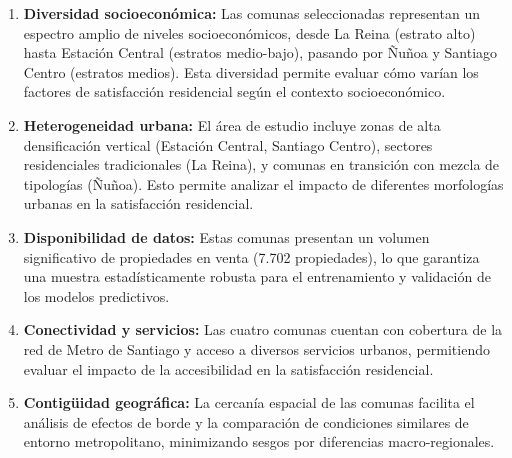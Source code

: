 \begin{enumerate}
    \item \textbf{Diversidad socioeconómica:} Las comunas seleccionadas representan un espectro amplio de niveles socioeconómicos, desde La Reina (estrato alto) hasta Estación Central (estratos medio-bajo), pasando por Ñuñoa y Santiago Centro (estratos medios). Esta diversidad permite evaluar cómo varían los factores de satisfacción residencial según el contexto socioeconómico.
    
    \item \textbf{Heterogeneidad urbana:} El área de estudio incluye zonas de alta densificación vertical (Estación Central, Santiago Centro), sectores residenciales tradicionales (La Reina), y comunas en transición con mezcla de tipologías (Ñuñoa). Esto permite analizar el impacto de diferentes morfologías urbanas en la satisfacción residencial.
    
    \item \textbf{Disponibilidad de datos:} Estas comunas presentan un volumen significativo de propiedades en venta (7.702 propiedades), lo que garantiza una muestra estadísticamente robusta para el entrenamiento y validación de los modelos predictivos.
    
    \item \textbf{Conectividad y servicios:} Las cuatro comunas cuentan con cobertura de la red de Metro de Santiago y acceso a diversos servicios urbanos, permitiendo evaluar el impacto de la accesibilidad en la satisfacción residencial.
    
    \item \textbf{Contigüidad geográfica:} La cercanía espacial de las comunas facilita el análisis de efectos de borde y la comparación de condiciones similares de entorno metropolitano, minimizando sesgos por diferencias macro-regionales.
\end{enumerate} 


